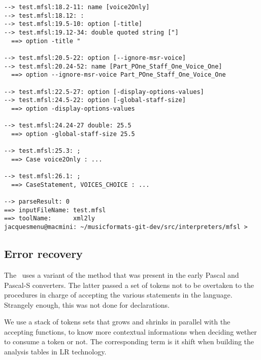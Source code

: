 \begin{lstlisting}[language=Terminal]
--> test.mfsl:18.2-11: name [voice2Only]
--> test.mfsl:18.12: :
--> test.mfsl:19.5-10: option [-title]
--> test.mfsl:19.12-34: double quoted string ["]
  ==> option -title "

--> test.mfsl:20.5-22: option [--ignore-msr-voice]
--> test.mfsl:20.24-52: name [Part_POne_Staff_One_Voice_One]
  ==> option --ignore-msr-voice Part_POne_Staff_One_Voice_One

--> test.mfsl:22.5-27: option [-display-options-values]
--> test.mfsl:24.5-22: option [-global-staff-size]
  ==> option -display-options-values

--> test.mfsl:24.24-27 double: 25.5
  ==> option -global-staff-size 25.5

--> test.mfsl:25.3: ;
  ==> Case voice2Only : ...

--> test.mfsl:26.1: ;
  ==> CaseStatement, VOICES_CHOICE : ...

--> parseResult: 0
==> inputFileName: test.mfsl
==> toolName:      xml2ly
jacquesmenu@macmini: ~/musicformats-git-dev/src/interpreters/mfsl > 
\end{lstlisting}


\subsection{Error recovery}

The \mfslLangInterp\ uses a variant of the  method that was present in the early Pascal and Pascal-S converters. The latter passed a set of tokens not to be overtaken to the procedures in charge of accepting the various statements in the language. Strangely enough, this was not done for declarations.

We use a stack of tokens sets that grows and shrinks in parallel with the accepting functions, to know more contextual informations when deciding wether to consume a token or not. The corresponding term is {it shift}
when building the analysis tables in LR technology.


